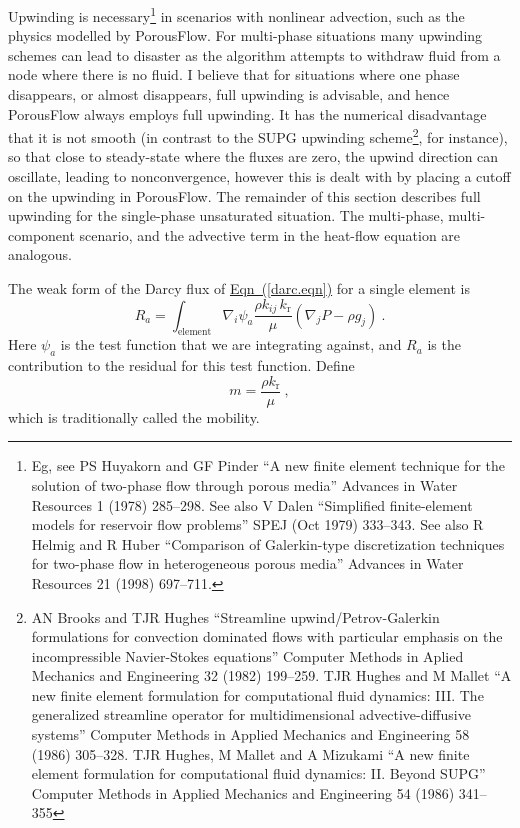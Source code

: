 \documentclass[12pt]{report}
\begin{document}
Upwinding is necessary\footnote{Eg, see PS Huyakorn and GF Pinder ``A
  new finite element technique for the solution of two-phase flow
  through porous media'' Advances in Water Resources 1 (1978)
  285--298.  See also V Dalen ``Simplified finite-element models for
  reservoir flow problems'' SPEJ (Oct 1979) 333--343.  See also R
  Helmig and R Huber ``Comparison of Galerkin-type discretization
  techniques for two-phase flow in heterogeneous porous media''
  Advances in Water Resources 21 (1998) 697--711.} in scenarios with
nonlinear advection, such as the physics modelled by PorousFlow.  For
multi-phase situations many upwinding schemes can lead to disaster as
the algorithm attempts to withdraw fluid from a node where there is no
fluid.  I believe that for situations where one phase disappears, or
almost disappears, full upwinding is advisable, and hence PorousFlow
always employs full upwinding.  It has the numerical disadvantage that
it is not smooth (in contrast to the SUPG upwinding scheme\footnote{AN
  Brooks and TJR Hughes ``Streamline upwind/Petrov-Galerkin
  formulations for convection dominated flows with particular emphasis
  on the incompressible Navier-Stokes equations'' Computer Methods in
  Aplied Mechanics and Engineering 32 (1982) 199--259.  TJR Hughes and
  M Mallet ``A new finite element formulation for computational fluid
  dynamics: III. The generalized streamline operator for
  multidimensional advective-diffusive systems'' Computer Methods in
  Applied Mechanics and Engineering 58 (1986) 305--328.  TJR Hughes, M
  Mallet and A Mizukami ``A new finite element formulation for
  computational fluid dynamics: II. Beyond SUPG'' Computer Methods in
  Applied Mechanics and Engineering 54 (1986) 341--355}, for
instance), so that close to steady-state where the fluxes are zero,
the upwind direction can oscillate, leading to nonconvergence, however
this is dealt with by placing a cutoff on the upwinding in PorousFlow.
The remainder of this section describes full upwinding for the
single-phase unsaturated situation.  The multi-phase, multi-component
scenario, and the advective term in the heat-flow equation are
analogous.

The weak form of the Darcy flux of
\hyperref[darc.eqn]{Eqn~(\ref*{darc.eqn})} for a single element is
\begin{equation}
R_{a} = \int_{\mathrm{element}} \nabla_{i}\psi_{a}
\frac{\rho k_{ij}\,k_{\mathrm{r}}}{\mu}(\nabla_{j}P - \rho
g_{j})  \ .
\end{equation}
Here $\psi_{a}$ is the test function that we are integrating against,
and $R_{a}$ is the contribution to the residual for this test
function.  Define
\begin{equation}
m = \frac{\rho k_{\mathrm{r}}}{\mu} \ ,
\end{equation}
which is traditionally called the mobility.
\end{document}
